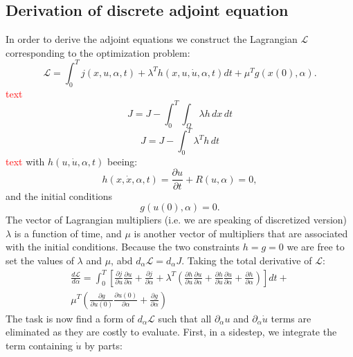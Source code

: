\documentclass[10pt]{article}
\begin{document}
\subsection{Derivation of discrete adjoint equation}
In order to derive the adjoint equations we construct the Lagrangian $\mathcal{L}$ corresponding to the optimization problem:
\begin{equation}
\mathcal{L} = \int_{0}^{T} j\left(x,u,\alpha,t\right) +\lambda^T h(x,u,\dot u, \alpha,t) dt +\mu^T g(x(0),\alpha).
\end{equation}
\textcolor{red}{text}
\begin{equation}
J = J - \int_{0}^{T} \int_{\Omega} \lambda h \,dx\,dt
\end{equation}
\begin{equation}
J = J - \int_{0}^{T} \lambda^T h \,dt
\end{equation}
\textcolor{red}{text}
with $h(u,\dot u, \alpha,t)$ beeing:
\begin{equation}
h(x,\dot x, \alpha,t) = \frac{\partial u}{\partial t} + R\left(u, \alpha \right) = 0,
\end{equation}
and the initial conditions
\begin{equation}
g(u(0),\alpha) = 0.
\end{equation}
The vector of Lagrangian multipliers (i.e. we are speaking of discretized version) $\lambda$ is a function of time, and $\mu$ is another vector of multipliers that are associated with the initial conditions. Because the two constraints $h = g = 0$ we are free to set the values of $\lambda$ and $\mu$, abd $d_{\alpha}\mathcal{L} = d_{\alpha}J$. Taking the total derivative of $\mathcal{L}$:
\begin{align}
\frac{d\mathcal{L}}{d \alpha} = \int_{0}^{T}\left[\frac{\partial j}{\partial u} \frac{\partial u}{\partial \alpha} + 
\frac{\partial j}{\partial \alpha} +
\lambda^T \left( \frac{\partial h}{\partial u} \frac{\partial u}{\partial \alpha} + \frac{\partial h}{\partial\dot u} \frac{\partial\dot u}{\partial \alpha} +
\frac{\partial h}{\partial \alpha} \right)\right] dt + \\
\mu^T \left( \frac{\partial g}{\partial u(0)} \frac{\partial u(0)}{\partial\alpha}  + \frac{\partial g}{\partial\alpha} \right)
\end{align}
The task is now find a form of $d_{\alpha}\mathcal{L}$ such that all $\partial_{\alpha} u$ and $\partial_{\alpha}\dot u$ terms are eliminated as they are costly to evaluate. First, in a sidestep, we integrate the term containing $\dot u$ by parts:
\end{document}
